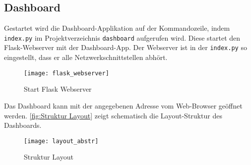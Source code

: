     \subsection{Dashboard}
    Gestartet wird die Dashboard-Applikation auf der Kommandozeile, indem \texttt{index.py} im Projektverzeichnis \texttt{dashboard}
    aufgerufen wird. Diese startet den Flask-Webserver mit der Dashboard-App. Der Webserver ist in der \texttt{index.py} so eingestellt, 
    dass er alle Netzwerkschnittstellen abhört.


    \begin{figure}[H]
        \centering
            \texttt{[image: flask\_webserver]}
            \caption{Start Flask Webserver}
            \label{fig:flask}
    \end{figure}

    
    Das Dashboard kann mit der angegebenen Adresse vom Web-Browser geöffnet werden.
    \autoref{fig:Struktur Layout} zeigt schematisch die Layout-Struktur des Dashboards. 


    \begin{figure}[H]
        \centering
            \texttt{[image: layout\_abstr]}
            \caption{Struktur Layout}
            \label{fig:Struktur Layout}
    \end{figure}


